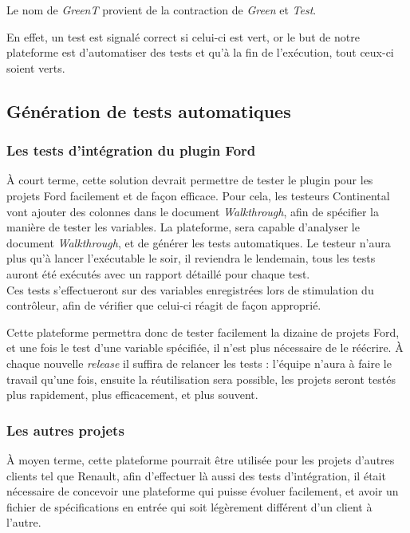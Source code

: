 	\begin{exemple}
		Le nom de \textit{GreenT} provient de la contraction de \textit{Green} et \textit{Test}.
		
		En effet, un test est signalé correct si celui-ci est vert, or le but de notre plateforme est d'automatiser des tests et qu'à la fin de l'exécution, tout ceux-ci soient verts.
	\end{exemple}
	\subsection{Génération de tests automatiques}
	\subsubsection{Les tests d'intégration du plugin Ford}
	À court terme, cette solution devrait permettre de tester le plugin pour les projets Ford facilement et de façon efficace. Pour cela, les testeurs Continental vont ajouter des colonnes dans le document \textit{Walkthrough}, afin de spécifier la manière de tester les variables. La plateforme, sera capable d'analyser le document \textit{Walkthrough}, et de générer les tests automatiques. Le testeur n'aura plus qu'à lancer l'exécutable le soir, il reviendra le lendemain, tous les tests auront été exécutés avec un rapport détaillé pour chaque test.\\

	Ces tests s'effectueront sur des variables enregistrées lors de stimulation du contrôleur, afin de vérifier que celui-ci réagit de façon approprié.

	Cette plateforme permettra donc de tester facilement la dizaine de projets Ford, et une fois le test d'une variable spécifiée, il n'est plus nécessaire de le réécrire. À chaque nouvelle \textit{release} il suffira de relancer les tests : l'équipe n'aura à faire le travail qu'une fois, ensuite la réutilisation sera possible, les projets seront testés plus rapidement, plus efficacement, et plus souvent.

	\subsubsection{Les autres projets}
	À moyen terme, cette plateforme pourrait être utilisée pour les projets d'autres clients tel que Renault, afin d'effectuer là aussi des tests d'intégration, il était nécessaire de concevoir une plateforme qui puisse évoluer facilement, et avoir un fichier de spécifications en entrée qui soit légèrement différent d'un client à l'autre.

